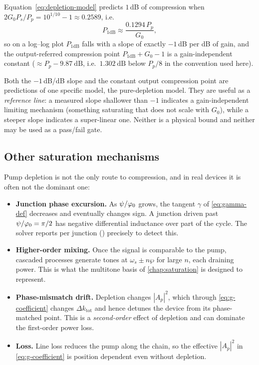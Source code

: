 Equation~\eqref{eq:depletion-model} predicts $1$\,dB of compression when
$2G_0P_s/P_p = 10^{1/10}-1 \approx 0.2589$, i.e.
\begin{equation}
  P_{1\mathrm{dB}} \approx \frac{0.1294\,P_p}{G_0},
\end{equation}
so on a log--log plot $P_{1\mathrm{dB}}$ falls with a slope of exactly
$-1$\,dB per dB of gain, and the output-referred compression point
$P_{1\mathrm{dB}} + G_0 - 1$ is a gain-independent constant
($\approx P_p - \SI{9.87}{\dB}$, i.e.\ $\SI{1.302}{\dB}$ below
$P_p/8$ in the convention used here).

\begin{caveat}
Both the $-1$\,dB/dB slope and the constant output compression point are
predictions of one specific model, the pure-depletion model. They are useful as
a \emph{reference line}: a measured slope shallower than $-1$ indicates a
gain-independent limiting mechanism (something saturating that does not scale
with $G_0$), while a steeper slope indicates a super-linear one. Neither is a
physical bound and neither may be used as a pass/fail gate.
\end{caveat}

\subsection{Other saturation mechanisms}

Pump depletion is not the only route to compression, and in real devices it is
often not the dominant one:

\begin{itemize}
\item \textbf{Junction phase excursion.} As $\psi/\varphi_{0}$ grows, the tangent
      $\gamma$ of \eqref{eq:gamma-def} decreases and eventually changes sign. A
      junction driven past $\psi/\varphi_{0} = \pi/2$ has negative differential
      inductance over part of the cycle. The solver reports
       per junction () precisely
      to detect this.

\item \textbf{Higher-order mixing.} Once the signal is comparable to the pump,
      cascaded processes generate tones at $\omega_s \pm n\wp$ for large $n$,
      each draining power. This is what the multitone basis of
      \cref{chap:saturation} is designed to represent.

\item \textbf{Phase-mismatch drift.} Depletion changes $|A_p|^{2}$, which
      through \eqref{eq:g-coefficient} changes $\Delta k_{\mathrm{tot}}$ and
      hence detunes the device from its phase-matched point. This is a
      \emph{second-order} effect of depletion and can dominate the first-order
      power loss.

\item \textbf{Loss.} Line loss reduces the pump along the chain, so the
      effective $|A_p|^{2}$ in \eqref{eq:g-coefficient} is position dependent
      even without depletion.
\end{itemize}

